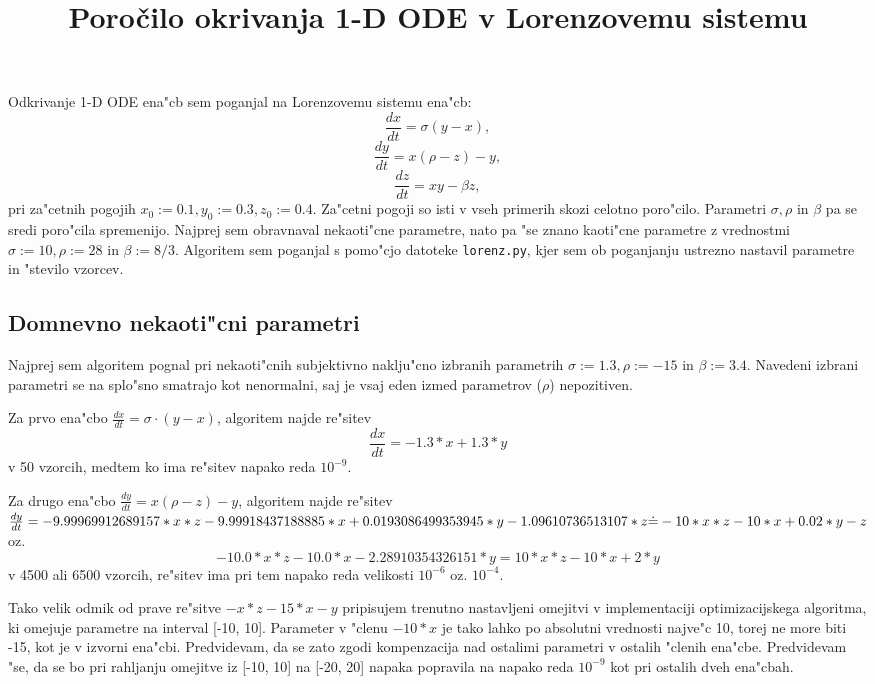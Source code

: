 \documentclass[10pt,a4paper]{article}
\title{Poročilo okrivanja 1-D ODE v Lorenzovemu sistemu}
\begin{document}
	\maketitle
    
Odkrivanje 1-D ODE ena"cb sem poganjal na Lorenzovemu sistemu ena"cb:
$$
\frac{dx}{dt} = \sigma (y-x),
$$ $$
\frac{dy}{dt} = x(\rho-z) - y,
$$ $$
\frac{dz}{dt} = xy - \beta z,
$$
pri za"cetnih pogojih $x_0:=0.1, y_0:=0.3, z_0:=0.4$.
Za"cetni pogoji so isti v vseh primerih skozi celotno poro"cilo.
Parametri $\sigma, \rho$ in $\beta$ pa se sredi poro"cila
spremenijo. Najprej sem obravnaval nekaoti"cne parametre, nato 
pa "se znano kaoti"cne parametre z vrednostmi
$\sigma:=10, \rho:=28$ in $\beta:=8/3$.
Algoritem sem poganjal s pomo"cjo datoteke \verb|lorenz.py|, kjer sem ob poganjanju
ustrezno nastavil parametre in "stevilo vzorcev.

\subsection{Domnevno nekaoti"cni parametri}
Najprej sem algoritem pognal pri nekaoti"cnih subjektivno naklju"cno izbranih parametrih
$\sigma:=1.3, \rho:=-15$ in $\beta:=3.4$.
Navedeni izbrani parametri se na splo"sno smatrajo kot nenormalni, saj je vsaj eden izmed parametrov
($\rho$) nepozitiven.

Za prvo ena"cbo $\frac{dx}{dt} = \sigma \cdot(y-x)$, algoritem najde re"sitev 
$$\frac{dx}{dt} =  -1.3*x + 1.3*y$$ 
v 50 vzorcih, medtem ko ima re"sitev napako reda $10^{-9}$.

Za drugo ena"cbo 
$\frac{dy}{dt} = x(\rho-z) - y$,
algoritem najde re"sitev  \\
$\frac{dy}{dt} = -9.99969912689157*x*z - 9.99918437188885*x 
+ 0.0193086499353945*y - 1.09610736513107*z \\ 
\dot{=} -10*x*z -10*x +0.02*y -z $
\enspace oz. $$-10.0*x*z - 10.0*x - 2.28910354326151*y = 10*x*z -10*x +2*y$$ v 
4500 ali 6500 vzorcih, re"sitev ima pri tem napako 
reda velikosti $10^{-6}$ oz. $10^{-4}$. 

Tako velik odmik od prave re"sitve  
$-x*z-15*x-y$ pripisujem trenutno nastavljeni omejitvi v implementaciji optimizacijskega
algoritma, ki omejuje parametre na interval [-10, 10]. Parameter v "clenu $-10*x$ je tako
lahko po absolutni vrednosti najve"c 10, torej ne more biti -15, kot je v izvorni ena"cbi.
Predvidevam, da se zato zgodi kompenzacija nad ostalimi parametri v ostalih "clenih ena"cbe.
Predvidevam "se, da se bo pri rahljanju omejitve iz [-10, 10] na [-20, 20] napaka popravila
na napako reda $10^{-9}$ kot pri ostalih dveh ena"cbah.
\end{document}
